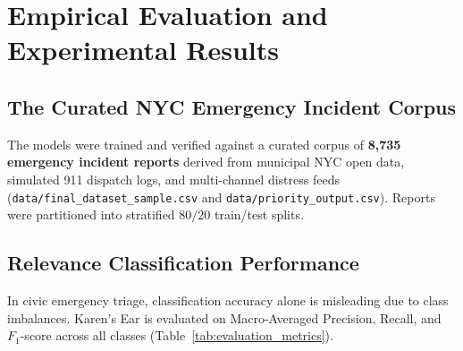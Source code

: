 \documentclass[10pt,a4paper]{article}
\begin{document}
\section{Empirical Evaluation and Experimental Results}
\subsection{The Curated NYC Emergency Incident Corpus}
The models were trained and verified against a curated corpus of \textbf{8,735 emergency incident reports} derived from municipal NYC open data, simulated 911 dispatch logs, and multi-channel distress feeds (\texttt{data/final\_dataset\_sample.csv} and \texttt{data/priority\_output.csv}). Reports were partitioned into stratified $80/20$ train/test splits.

\subsection{Relevance Classification Performance}
In civic emergency triage, classification accuracy alone is misleading due to class imbalances. Karen's Ear is evaluated on Macro-Averaged Precision, Recall, and $F_1$-score across all classes (Table~\ref{tab:evaluation_metrics}).
\end{document}
